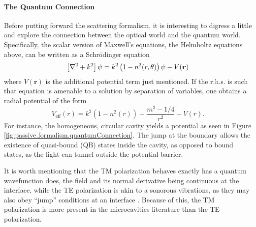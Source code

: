 \paragraph{The Quantum Connection}
Before putting forward the scattering formalism, it is interesting
to digress a little and explore the connection between the optical 
world and the quantum world. Specifically, the scalar version of
Maxwell's equations, the Helmholtz equations above, can be written 
as a Schrödinger equation
	\begin{equation}
		\left[\nabla^2+k^2\right]\psi = k^2\left(1-n^2(r,\theta)\right)\psi - V(\boldsymbol{r})
	\end{equation}
where $V(\boldsymbol{r})$  is the additional potential term just mentioned.
If the r.h.s. is such that equation is amenable to a solution by 
separation of variables, one obtains a radial potential of the form
	\begin{equation}
		V_\text{eff}(r) = k^2(1-n^2(r))+\frac{m^2-1/4}{r^2}-V(r).
	\end{equation}
For instance, the homogeneous, circular cavity yields a
potential as seen in Figure \ref{fig:passive.formalism.quantumConnection}. 
The jump at the boundary allows the existence of quasi-bound (QB) states inside
the cavity, as opposed to bound states, as the light can tunnel outside the
potential barrier.

It is worth mentioning that the TM polarization behaves exactly has a 
quantum wavefunction does, the field and its normal derivative being
continuous at the interface, while the TE polarization is akin to 
a sonorous vibrations, as they may also obey ``jump'' conditions
at an interface \cite{COL2013}. Because of this, the TM polarization
is more present in the microcavities literature than the TE polarization.

